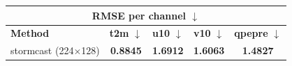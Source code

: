 \documentclass[border=10pt]{standalone}
\begin{document}
\begin{tabular}{lcccc}
\toprule
\multicolumn{5}{c}{\textbf{RMSE per channel} $\downarrow$} \\
\midrule
\textbf{Method} & \textbf{t2m} $\downarrow$ & \textbf{u10} $\downarrow$ & \textbf{v10} $\downarrow$ & \textbf{qpepre} $\downarrow$ \\
\midrule
stormcast (224$\times$128) & \textbf{0.8845} & \textbf{1.6912} & \textbf{1.6063} & \textbf{1.4827} \\
\bottomrule
\end{tabular}
\end{document}
